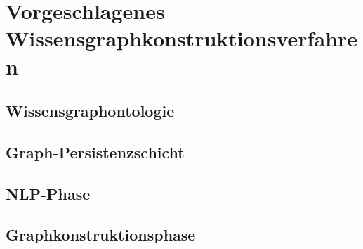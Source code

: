 %
\chapter{Vorgeschlagenes Wissensgraphkonstruktionsverfahren}
\label{sec:text2kg}

\section{Wissensgraphontologie}
\label{sec:text2kg:ontology}

\section{Graph-Persistenzschicht}
\label{sec:text2kg:persistency}

\section{NLP-Phase}
\label{sec:text2kg:nlp}

\section{Graphkonstruktionsphase}
\label{sec:text2kg:psl}
